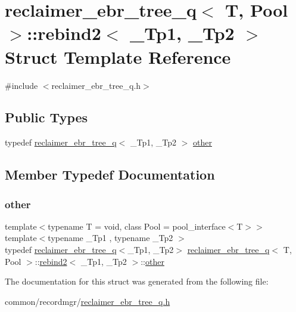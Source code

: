 \hypertarget{structreclaimer__ebr__tree__q_1_1rebind2}{}\section{reclaimer\+\_\+ebr\+\_\+tree\+\_\+q$<$ T, Pool $>$\+:\+:rebind2$<$ \+\_\+\+Tp1, \+\_\+\+Tp2 $>$ Struct Template Reference}
\label{structreclaimer__ebr__tree__q_1_1rebind2}


{\ttfamily \#include $<$reclaimer\+\_\+ebr\+\_\+tree\+\_\+q.\+h$>$}

\subsection*{Public Types}
\begin{DoxyCompactItemize}
\item 
typedef \hyperlink{classreclaimer__ebr__tree__q}{reclaimer\+\_\+ebr\+\_\+tree\+\_\+q}$<$ \+\_\+\+Tp1, \+\_\+\+Tp2 $>$ \hyperlink{structreclaimer__ebr__tree__q_1_1rebind2_aae686b369d9f784f21bc0f4d6f822773}{other}
\end{DoxyCompactItemize}


\subsection{Member Typedef Documentation}
\mbox{\label{structreclaimer__ebr__tree__q_1_1rebind2_aae686b369d9f784f21bc0f4d6f822773}} 
\subsubsection{\texorpdfstring{other}{other}}
{\footnotesize\ttfamily template$<$typename T  = void, class Pool  = pool\+\_\+interface$<$\+T$>$$>$ \\
template$<$typename \+\_\+\+Tp1 , typename \+\_\+\+Tp2 $>$ \\
typedef \hyperlink{classreclaimer__ebr__tree__q}{reclaimer\+\_\+ebr\+\_\+tree\+\_\+q}$<$\+\_\+\+Tp1, \+\_\+\+Tp2$>$ \hyperlink{classreclaimer__ebr__tree__q}{reclaimer\+\_\+ebr\+\_\+tree\+\_\+q}$<$ T, Pool $>$\+::\hyperlink{structreclaimer__ebr__tree__q_1_1rebind2}{rebind2}$<$ \+\_\+\+Tp1, \+\_\+\+Tp2 $>$\+::\hyperlink{structreclaimer__ebr__tree__q_1_1rebind2_aae686b369d9f784f21bc0f4d6f822773}{other}}



The documentation for this struct was generated from the following file\+:\begin{DoxyCompactItemize}
\item 
common/recordmgr/\hyperlink{reclaimer__ebr__tree__q_8h}{reclaimer\+\_\+ebr\+\_\+tree\+\_\+q.\+h}\end{DoxyCompactItemize}
